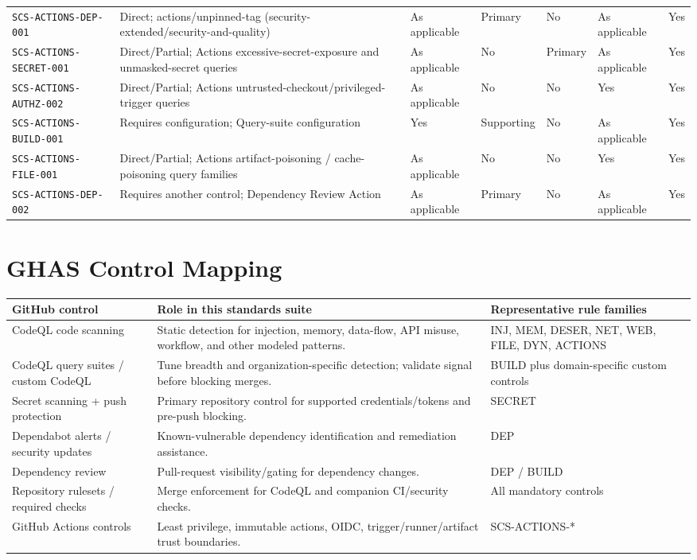 \documentclass[10pt,letterpaper]{article}
\newcommand{\code}[1]{\begingroup\small\ttfamily\def\UrlFont{\ttfamily}\nolinkurl{#1}\endgroup}
\begin{document}
\begin{landscape}
\begin{longtable}{@{}P{1.4in}P{1.35in}P{1.1in}P{1.1in}P{0.95in}P{1.3in}P{1.0in}@{}}
\code{SCS-ACTIONS-DEP-001} & Direct; actions/unpinned-tag (security-extended/security-and-quality) & As applicable & Primary & No & As applicable & Yes\\
\code{SCS-ACTIONS-SECRET-001} & Direct/Partial; Actions excessive-secret-exposure and unmasked-secret queries & As applicable & No & Primary & As applicable & Yes\\
\code{SCS-ACTIONS-AUTHZ-002} & Direct/Partial; Actions untrusted-checkout/privileged-trigger queries & As applicable & No & No & Yes & Yes\\
\code{SCS-ACTIONS-BUILD-001} & Requires configuration; Query-suite configuration & Yes & Supporting & No & As applicable & Yes\\
\code{SCS-ACTIONS-FILE-001} & Direct/Partial; Actions artifact-poisoning / cache-poisoning query families & As applicable & No & No & Yes & Yes\\
\code{SCS-ACTIONS-DEP-002} & Requires another control; Dependency Review Action & As applicable & Primary & No & As applicable & Yes\\
\bottomrule
\end{longtable}
\normalsize
\end{landscape}
\section{GHAS Control Mapping}
\begin{tabularx}{\textwidth}{@{}P{2.0in}Y P{2.2in}@{}}
\toprule
\textbf{GitHub control} & \textbf{Role in this standards suite} & \textbf{Representative rule families}\\
\midrule
CodeQL code scanning & Static detection for injection, memory, data-flow, API misuse, workflow, and other modeled patterns. & INJ, MEM, DESER, NET, WEB, FILE, DYN, ACTIONS\\
CodeQL query suites / custom CodeQL & Tune breadth and organization-specific detection; validate signal before blocking merges. & BUILD plus domain-specific custom controls\\
Secret scanning + push protection & Primary repository control for supported credentials/tokens and pre-push blocking. & SECRET\\
Dependabot alerts / security updates & Known-vulnerable dependency identification and remediation assistance. & DEP\\
Dependency review & Pull-request visibility/gating for dependency changes. & DEP / BUILD\\
Repository rulesets / required checks & Merge enforcement for CodeQL and companion CI/security checks. & All mandatory controls\\
GitHub Actions controls & Least privilege, immutable actions, OIDC, trigger/runner/artifact trust boundaries. & SCS-ACTIONS-*\\
\bottomrule
\end{tabularx}
\end{document}
